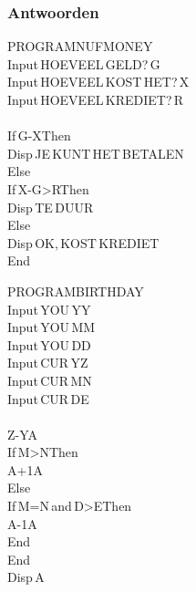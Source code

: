 \begin{frame}
\frametitle{Antwoorden}

\begin{minipage}{0.4\textwidth}
\begin{ticalc}
	PROGRAM\:NUFMONEY\\%
	\:Input\,\qt HOEVEEL\,GELD?\,\qt\comma G\\%
	\:Input\,\qt HOEVEEL\,KOST\,HET?\,\qt\comma X\\%
	\:Input\,\qt HOEVEEL\,KREDIET?\,\qt\comma R\\%
	\:\\%
	\:If\,G-X\:Then\\%
	\:Disp\,\qt JE\,KUNT\,HET\,BETALEN\qt\\%
	\:Else\\%
	\:If\,X-G>R\:Then\\%
	\:Disp\,\qt TE\,DUUR\qt\\%
	\:Else\\%
	\:Disp\,\qt OK,\,KOST\,KREDIET\qt\\%
	\:End
\end{ticalc}
\end{minipage}
\begin{minipage}{0.4\textwidth}
\begin{ticalc}[5cm]
	PROGRAM\:BIRTHDAY\\%
	\:Input\,\qt YOU\,Y\qt\comma Y\\%
	\:Input\,\qt YOU\,M\qt\comma M\\%
	\:Input\,\qt YOU\,D\qt\comma D\\%
	\:Input\,\qt CUR\,Y\qt\comma Z\\%
	\:Input\,\qt CUR\,M\qt\comma N\\%
	\:Input\,\qt CUR\,D\qt\comma E\\%
	\:\\%
	\:Z-Y\>A\\%
	\:If\,M>N\:Then\\%
	\:A+1\>A\\%
	\:Else\\%
	\:If\,M=N\,and\,D>E\:Then\\%
	\:A-1\>A\\%
	\:End\\%
	\:End\\%
	\:Disp\,A
\end{ticalc}
\end{minipage}

\end{frame}



